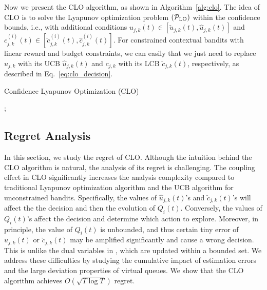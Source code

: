 Now we present the CLO algorithm, as shown in Algorithm~\ref{alg:clo}. The idea of CLO is to solve the Lyapunov optimization problem $(\mathcal{P}_{\rm LO})$ 
within the confidence bounds, i.e., with additional conditions $u_{j,k}(t) \in [\check{u}_{j,k}(t), \hat{u}_{j,k}(t)]$ and $c_{j,k}^{(i)}(t) \in [\check{c}_{j,k}^{(i)}(t), \hat{c}_{j,k}^{(i)}(t)]$.
For constrained contextual bandits with linear reward and budget constraints, we can easily that we just need to replace $u_{j,k}$ 
with its UCB $\hat{u}_{j,k}(t)$ and $c_{j,k}$ with its LCB $\check{c}_{j,k}(t)$, respectively, as described in Eq.~\eqref{eq:clo_decision}.
\begin{algorithm}[htbp]
\caption{Confidence Lyapunov Optimization (CLO)}
\label{alg:clo}
\renewcommand{\algorithmicrequire}{\textbf{Input:}}
\renewcommand{\algorithmicensure}{\textbf{Output:}}
\renewcommand\algorithmiccomment[1]{%
{//{\it ~{#1}}}%
}
\begin{algorithmic}[1]
\STATE{\algorithmicrequire ~$T$, $\bs{b}$, $V$;}
;
\ENDFOR
\end{algorithmic}
\end{algorithm}

\subsection{Regret Analysis}

In this section, we study the regret of CLO. Although the intuition behind the CLO algorithm is natural, the analysis of its regret is challenging. The coupling effect in CLO significantly increases the analysis complexity compared to traditional Lyapunov optimization algorithm and the UCB algorithm for unconstrained bandits. Specifically, the values of $\hat{u}_{j,k}(t)$'s and $\check{c}_{j,k}(t)$'s will affect the the decision and then the evolution of $Q_i(t)$. Conversely, the values  of $Q_i(t)$'s affect the decision and determine which action to explore. Moreover, in principle, the value of $Q_i(t)$ is unbounded,  and thus certain tiny error of $\hat{u}_{j,k}(t)$ or $\check{c}_{j,k}(t)$ may be amplified significantly and cause a wrong decision. This is unlike the dual variables in \cite{Agrawal2015TR:LCB}, which are updated within a bounded set.
We address these difficulties by studying the cumulative impact of estimation errors and the large deviation properties of virtual queues. We show that the CLO algorithm achieves $O(\sqrt{T \log T})$ regret.

